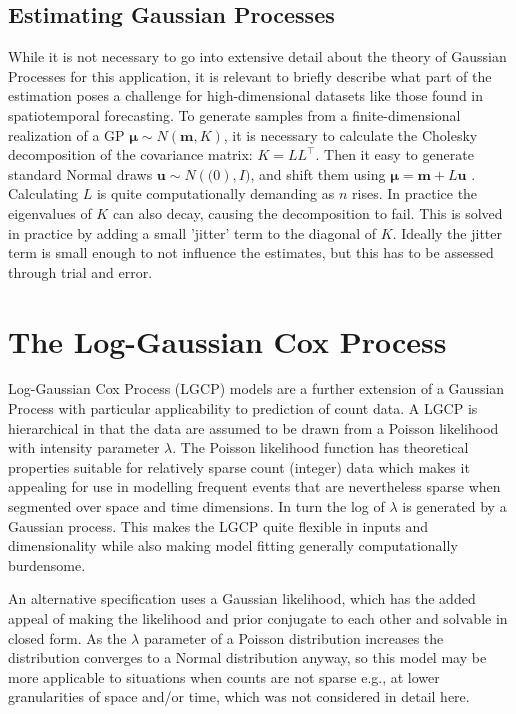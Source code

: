 \subsection{Estimating Gaussian Processes}

While it is not necessary to go into extensive detail about the theory of Gaussian Processes for this application, it is relevant to briefly describe what part of the estimation poses a challenge for high-dimensional datasets like those found in spatiotemporal forecasting. To generate samples from a finite-dimensional realization of a GP $\mathbf{\mu} \sim N(\mathbf{m},K)$, it is necessary to calculate the Cholesky decomposition of the covariance matrix: $K=LL^\intercal$. Then it easy to generate standard Normal draws $\mathbf{u} \sim N(\mathbf(0),I)$, and shift them using $\mathbf{\mu}=\mathbf{m}+L\mathbf{u}$ \cite{rasmussen_2005}. Calculating $L$ is quite computationally demanding as $n$ rises. In practice the eigenvalues of $K$ can also decay, causing the decomposition to fail. This is solved in practice by adding a small 'jitter' term to the diagonal of $K$. Ideally the jitter term is small enough to not influence the estimates, but this has to be assessed through trial and error. \par


\section{The Log-Gaussian Cox Process}

Log-Gaussian Cox Process (LGCP) models are a further extension of a Gaussian Process with particular applicability to prediction of count data. A LGCP is hierarchical in that the data are assumed to be drawn from a Poisson likelihood with intensity parameter $\lambda$. The Poisson likelihood function has theoretical properties suitable for relatively sparse count (integer) data which makes it appealing for use in modelling frequent events that are nevertheless sparse when segmented over space and time dimensions. In turn the log of $\lambda$  is generated by a Gaussian process\cite{teng_2017}. This makes the LGCP quite flexible in inputs and dimensionality while also making model fitting generally computationally burdensome. \par

An alternative specification uses a Gaussian likelihood, which has the added appeal of making the likelihood and prior conjugate to each other and solvable in closed form. As the $\lambda$ parameter of a Poisson distribution increases the distribution converges to a Normal distribution anyway, so this model may be more applicable to situations when counts are not sparse e.g., at lower granularities of space and/or time, which was not considered in detail here.

